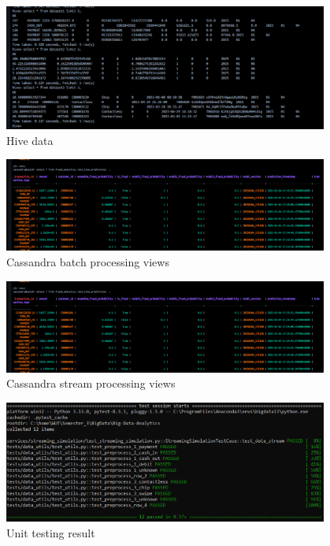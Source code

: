 \documentclass[12pt,a4paper, hidelinks]{article}
\begin{document}
\begin{figure}[h!]
  \centering
  \includegraphics[width=0.95\textwidth]{images/m3-hive-tables.png}
  \caption{Hive data}
  \label{fig:hive1}
\end{figure}



\begin{figure}[h!]
  \centering
  \includegraphics[width=0.95\textwidth]{images/m3-cassandra-streaming-processing.png}
  \caption{Cassandra batch processing views}
  \label{fig:cassandra-batch}
\end{figure}

\begin{figure}[h!]
  \centering
  \includegraphics[width=0.95\textwidth]{images/m3-cassandra-streaming-processing.png}
  \caption{Cassandra stream processing views}
  \label{fig:cassandra-strean}
\end{figure}




\begin{figure}[h!]
  \centering
  \includegraphics[width=0.95\textwidth]{images/unittests-M2.png}
  \caption{Unit testing result}
  \label{fig:unittests}
\end{figure}
\end{document}
